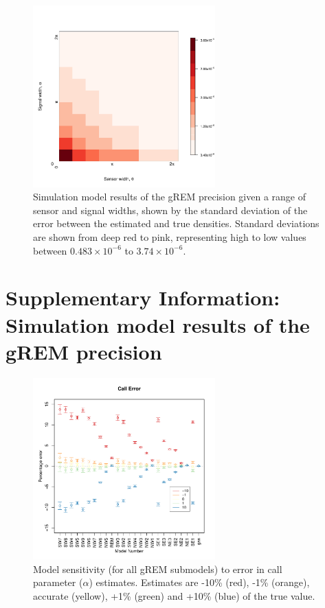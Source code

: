 \documentclass[a4paper,10pt,reqno,oneside]{amsart}
\begin{document}
\begin{figure}[h!]
	\includegraphics[width=7cm]{../imgs/ResultStandardDeviation.pdf}
	\caption{Simulation model results of the gREM precision given a range of sensor and signal widths, shown by the standard deviation of the error between the estimated and true densities. Standard deviations are shown from deep red to pink, representing high to low values between $0.483\times10^{-6}$ to $3.74\times10^{-6}$. 
        } 
	\label{f:StandardDeviation}
\end{figure}


\clearpage
\section{Supplementary Information: Simulation model results of the gREM precision  }
\setcounter{figure}{0}    

\begin{figure}[h!]
	\includegraphics[width=7cm]{imgs/AverageModelBias_callerror.pdf}
	\caption{Model sensitivity (for all gREM submodels) to error in call parameter ($\alpha$) estimates. Estimates are -10\% (red), -1\% (orange), accurate (yellow), +1\% (green) and +10\% (blue) of the true value. } 
	\label{f:sensCallError}
\end{figure}
\end{document}
